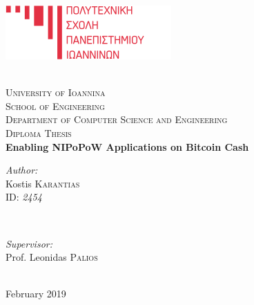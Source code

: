 \begin{titlepage}
  \begin{minipage}{0.4\textwidth}
    \begin{flushleft} \large
      \hspace*{-0.5cm}
      \includegraphics[scale=0.4]{eng-uoi-logo}\\
    \end{flushleft}
  \end{minipage}\\
  \center
  \textsc{\LARGE University of Ioannina\\[0.1cm] School of Engineering}\\[0.5cm]
  \textsc{\Large Department of Computer Science and Engineering}\\[0.4cm]
  \textsc{\Large Diploma Thesis}\\[1cm]

  \LARGE \textbf{Enabling NIPoPoW Applications on Bitcoin Cash} \\[1cm] 

  \begin{minipage}{0.4\textwidth}
    \begin{flushleft} \large
      \emph{Author:} \\
      Kostis \textsc{Karantias}\\
      ID: \emph{2454}
    \end{flushleft}
  \end{minipage}
    ~
  \begin{minipage}{0.5\textwidth}
    \begin{flushright} \large
      \emph{Supervisor:} \\
      Prof. Leonidas \textsc{Palios}
    \end{flushright}
  \end{minipage}\\[1cm]

  {\large February 2019}
\end{titlepage}
